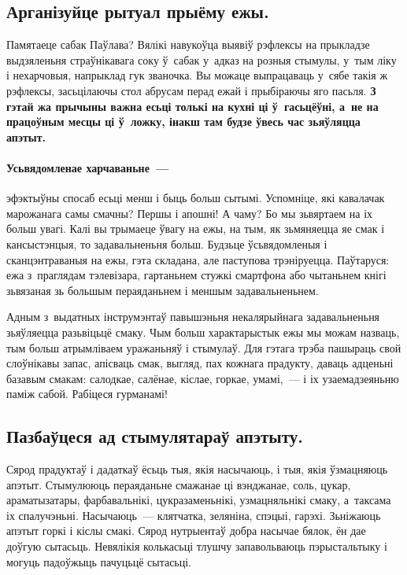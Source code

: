 \subsection*{Арганізуйце рытуал прыёму ежы.}
Памятаеце сабак Паўлава? Вялікі навукоўца выявіў рэфлексы на прыкладзе выдзяленьня страўнікавага соку ў~сабак у~адказ на розныя стымулы, у~тым ліку і нехарчовыя, напрыклад гук званочка. Вы можаце выпрацаваць у~сябе такія ж рэфлексы, засьцілаючы стол абрусам перад ежай і прыбіраючы яго пасьля. \textbf{З гэтай жа прычыны важна есьці толькі на кухні ці ў~гасьцёўні, а~не на працоўным месцы ці ў~ложку, інакш там будзе ўвесь час зьяўляцца апэтыт.}

\paragraph{Усьвядомленае харчаваньне~---} эфэктыўны спосаб есьці менш і быць больш сытымі. Успомніце, які кавалачак марожанага самы смачны? Першы і апошні! А чаму? Бо мы зьвяртаем на іх больш увагі. Калі вы трымаеце ўвагу на ежы, на тым, як зьмяняецца яе смак і кансыстэнцыя, то задавальненьня больш. Будзьце ўсьвядомленыя і сканцэнтраваныя на ежы, гэта складана, але паступова трэніруецца. Паўтаруся: ежа з~праглядам тэлевізара, гартаньнем стужкі смартфона або чытаньнем кнігі зьвязаная зь большым пераяданьнем і меншым задавальненьнем.


Адным з~выдатных інструмэнтаў павышэньня некалярыйнага задавальненьня зьяўляецца разьвіцьцё смаку. Чым больш характарыстык ежы мы можам назваць, тым больш атрымліваем уражаньняў і стымулаў. Для гэтага трэба пашыраць свой слоўнікавы запас, апісваць смак, выгляд, пах кожнага прадукту, даваць адценьні базавым смакам: салодкае, салёнае, кіслае, горкае, умамі,~--- і іх узаемадзеяньню паміж сабой. Рабіцеся гурманамі!

\subsection*{Пазбаўцеся ад стымулятараў апэтыту.}
Сярод прадуктаў і дадаткаў ёсьць тыя, якія насычаюць, і тыя, якія ўзмацняюць апэтыт. Стымулююць пераяданьне смажанае ці вэнджанае, соль, цукар, араматызатары, фарбавальнікі, цукразаменьнікі, узмацняльнікі смаку, а~таксама іх спалучэньні. Насычаюць~--- клятчатка, зеляніна, спэцыі, гарэхі. Зьніжаюць апэтыт горкі і кіслы смакі. Сярод нутрыентаў добра насычае бялок, ён дае доўгую сытасьць. Невялікія колькасьці тлушчу запавольваюць пэрыстальтыку і могуць падоўжыць пачуцьцё сытасьці.

